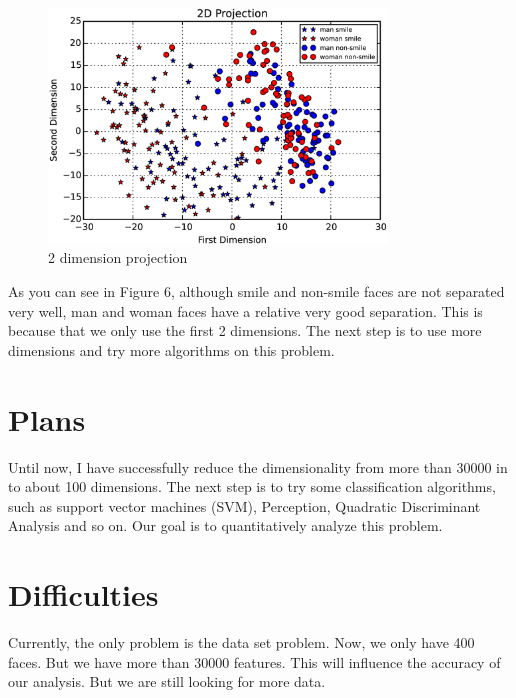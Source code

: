 \documentclass[11pt]{article}
\begin{document}
\begin{figure}[H]
\centering
\includegraphics[width=90mm]{2dProjection.png}
\caption{2 dimension projection}
\label{Fig2.lable}
\end{figure}

As you can see in Figure 6, although smile and non-smile faces are not separated very well, man and woman faces have a relative very good separation. This is because that we only use the first 2 dimensions. The next step is to use more dimensions and try more algorithms on this problem.\\

\section{Plans}

Until now, I have successfully reduce the dimensionality from more than 30000 in to about 100 dimensions. The next step is to try some classification algorithms, such as support vector machines (SVM), Perception, Quadratic Discriminant Analysis and so on. Our goal is to quantitatively analyze this problem.\\


\section{Difficulties}

Currently, the only problem is the data set problem. Now, we only have 400 faces. But we have more than 30000 features. This will influence the accuracy of our analysis. But we are still looking for more data.
\end{document}
